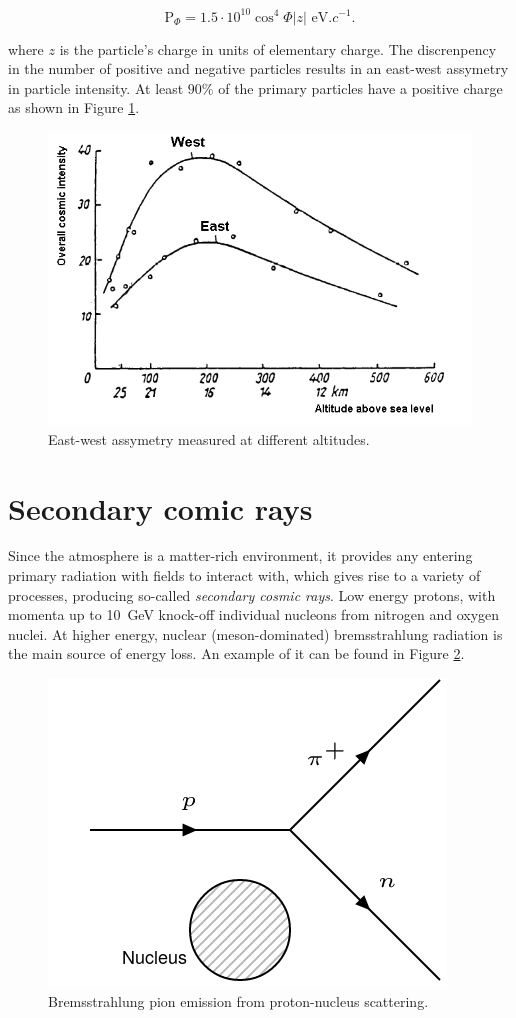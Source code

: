 \begin{equation}
\text{P}_\Phi=1.5\cdot 10^{10} \cos^4\Phi |z| \text{ eV}.c^{-1}.
\end{equation}

where $z$ is the particle's charge in units of elementary charge. The discrenpency in the number of positive and negative particles results in an east-west assymetry in particle intensity. At least $90\%$ of the primary particles have a positive charge as shown in Figure \ref{fig:assym}.

\begin{figure}[htbp] %
\centering
\includegraphics[width=0.8\linewidth]{./fig/assym.png}
\caption{East-west assymetry measured at different altitudes.}
\label{fig:assym}
\end{figure}


\section{Secondary comic rays}

Since the atmosphere is a matter-rich environment, it provides any entering primary radiation with fields to interact with, which gives rise to a variety of processes, producing so-called \textit{secondary cosmic rays}. Low energy protons, with momenta up to \SI{10}{\giga\electronvolt} knock-off individual nucleons from nitrogen and oxygen nuclei. At higher energy, nuclear (meson-dominated) bremsstrahlung radiation is the main source of energy loss. An example of it can be found in Figure \ref{fig:scat}. 

\begin{figure}[htbp]
\centering
\includegraphics[width=0.5\linewidth]{./fig/nscat.png}
\caption{Bremsstrahlung pion emission from proton-nucleus scattering.}
\label{fig:scat}
\end{figure}






